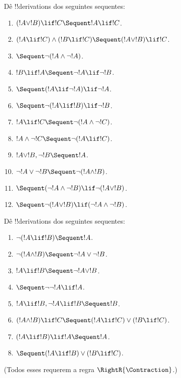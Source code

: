 \documentclass[../../../include/open-logic-section]{subfiles}
\begin{document}
\begin{prob}
Dê !!{derivation}s dos seguintes sequentes:
\begin{enumerate}
\item $(!A \lor !B) \lif !C \Sequent !A \lif !C$.
\item $(!A \lif !C) \land (!B \lif !C) \Sequent (!A \lor !B) \lif !C$.
\item $\Sequent \lnot(!A \land \lnot !A)$.
\item $!B \lif !A \Sequent \lnot !A \lif \lnot !B$.
\item $\Sequent (!A \lif \lnot !A) \lif \lnot !A$.
\item $\Sequent \lnot(!A \lif !B) \lif \lnot !B$.
\item $!A \lif !C \Sequent \lnot (!A \land \lnot !C)$.
\item $!A \land \lnot !C \Sequent \lnot (!A \lif !C)$.
\item $!A \lor !B, \lnot !B \Sequent !A$.
\item $\lnot !A \lor \lnot !B \Sequent \lnot(!A \land !B)$.
\item $\Sequent (\lnot !A \land \lnot !B) \lif\lnot(!A \lor !B)$.
\item $\Sequent \lnot(!A \lor !B) \lif (\lnot !A \land \lnot !B)$.
\end{enumerate}
\end{prob}

\begin{prob}
Dê !!{derivation}s dos seguintes sequentes:
\begin{enumerate}
\item $\lnot(!A \lif !B) \Sequent !A$.
\item $\lnot(!A \land !B) \Sequent \lnot !A \lor \lnot !B$.
\item $!A \lif !B \Sequent \lnot !A \lor !B$.
\item $\Sequent \lnot \lnot !A \lif !A$.
\item $!A \lif !B, \lnot !A \lif !B \Sequent !B$.
\item $(!A \land !B) \lif !C \Sequent (!A \lif !C) \lor (!B \lif !C)$.
\item $(!A \lif !B) \lif !A \Sequent !A$.
\item $\Sequent (!A \lif !B) \lor (!B \lif !C)$.
\end{enumerate}
(Todos esses requerem a regra $\RightR{\Contraction}$.)
\end{prob}
\end{document}
